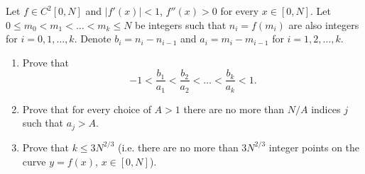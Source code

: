 \documentclass{article}
\begin{document}
	\setlength{\parindent}{0pt}
	Let $f\in C^2[0, N]$ and $\lvert f'(x)\rvert < 1$, $f''(x) > 0$ for every $x\in [0, N]$. Let
	$0 \leq m_0 < m_1 < \dots < m_k \leq N$ be integers such that $n_i = f(m_i)$ are also
	integers for $i = 0, 1, \dots , k$. Denote $b_i = n_i - n_{i-1}$ and $a_i = m_i - m_{i-1}$ for
	$i = 1, 2, \dots , k$.
	\begin{enumerate}[label=\alph*)]
		\item Prove that $$-1 <	\frac{b_1}{a_1}<	\frac{b_2}{a_2}	<\dots <\frac{b_k}{a_k}	< 1.$$
		\item Prove that for every choice of $A > 1$ there are no more than $N/A$
		indices $j$ such that $a_j > A$.
		\item Prove that $k \leq 3N^{2/3}$	(i.e. there are no more than $3N^{2/3}$	integer
		points on the curve $y = f(x)$, $x\in [0, N]$).		
	\end{enumerate}
\end{document}
